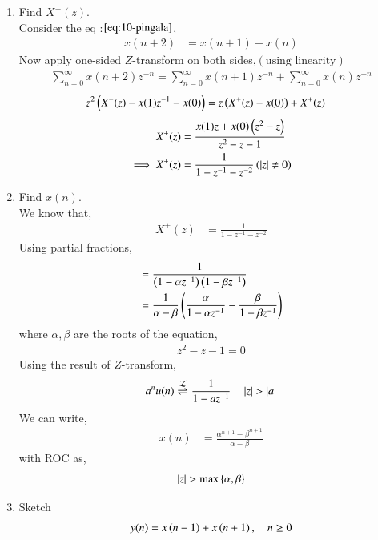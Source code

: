 \documentclass[journal,12pt,twocolumn]{IEEEtran}
\renewcommand\thesection{\arabic{section}}
\begin{document}
\begin{enumerate}[label=\thesection.\arabic*,ref=\thesection.\theenumi]
\item 	Find $X^{+}(z)$.\\
	\solution Consider the eq :$\eqref{eq:10-pingala}$,
	  \begin{align}
		x(n+2) &= x(n+1) + x(n)
	  \end{align}
	  Now apply one-sided $Z$-transform on both sides,$(\text{using linearity})$
         \begin{align}
		 \sum_{n=0}^{\infty}x(n+2)z^{-n} = \sum_{n=0}^{\infty}x(n+1)z^{-n} + \sum_{n=0}^{\infty}x(n)z^{-n} 
         \end{align}
	 \begin{align}
		 z^2\left(X^{+}(z) - x(1)z^{-1} - x(0)\right) &= z\left(X^{+}(z) - x(0)\right) + X^{+}(z)
	 \end{align}
	 \begin{align}
		 X^{+}(z) &= \frac{x(1)z + x(0)\left(z^2 - z\right)}{z^2 - z -1} \\
		 \implies X^{+}(z) &= \frac{1}{1-z^{-1}-z^{-2}} \label{eq:X_z} \left(\left\vert z\right\vert \neq 0\right)
	 \end{align}
	\item Find $x(n)$. \\
	 \solution We know that,
	  \begin{align}
            X^{+}(z) &= \frac{1}{1-z^{-1}-z^{-2}} 
          \end{align}
	  Using partial fractions,
	   \begin{align}
		   &= \frac{1}{\left(1-\alpha z^{-1}\right)\left(1-\beta z^{-1}\right)} \\
		   &= \frac{1}{\alpha - \beta}\left(\frac{\alpha}{1-\alpha z^{-1}} - \frac{\beta}{1-\beta z^{-1}}\right)
	   \end{align}
	     where $\alpha , \beta$ are the roots of the equation,
	      \begin{align}
		      z^2 - z -1 =0
	      \end{align}
          Using the result of $Z$-transform,
	  \begin{align}
	   a^nu(n) \overset{\mathcal{Z}}{ \rightleftharpoons} \frac{1}{1-az^{-1}} \quad \left\vert z\right\vert > \left\vert a\right\vert \\
          \end{align}
	      We can write, 
	      \begin{align}
		      x(n) &= \frac{\alpha^{n+1} - \beta^{n+1}}{\alpha -\beta}\label{eq:x_n} 
	      \end{align}
	      with ROC as,
	          \begin{align}
			  \left\vert z\right\vert > \text{max}\left\{\alpha,\beta\right\}
		  \end{align}
	\item Sketch 
\begin{align}
	y(n)	 = x\left(n-1\right) + x\left(n+1\right),  \quad n \ge 0 \label{eq:10-orig-diff-rev}
\end{align}


\end{enumerate}
\end{document}
